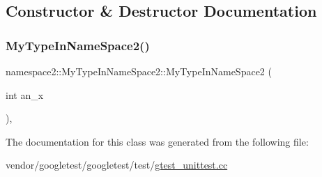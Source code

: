 \subsection{Constructor \& Destructor Documentation}
\mbox{\label{classnamespace2_1_1_my_type_in_name_space2_a033025628289dbf29022b2bfbe66f53e}} 
\subsubsection{\texorpdfstring{My\+Type\+In\+Name\+Space2()}{MyTypeInNameSpace2()}}
{\footnotesize\ttfamily namespace2\+::\+My\+Type\+In\+Name\+Space2\+::\+My\+Type\+In\+Name\+Space2 (\begin{DoxyParamCaption}\item[{int}]{an\+\_\+x }\end{DoxyParamCaption})\hspace{0.3cm}{\ttfamily [inline]}, {\ttfamily [explicit]}}



The documentation for this class was generated from the following file\+:\begin{DoxyCompactItemize}
\item 
vendor/googletest/googletest/test/\hyperlink{gtest__unittest_8cc}{gtest\+\_\+unittest.\+cc}\end{DoxyCompactItemize}
